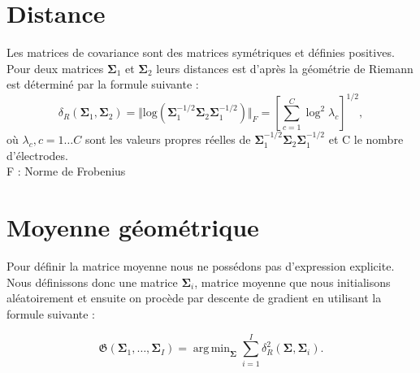 \documentclass{article}[12pt]
\newcommand{\argmin}{\mathop{\mathrm{arg\,min}}}
\begin{document}
\section{Distance}
Les matrices de covariance sont des matrices symétriques et définies positives.
Pour deux matrices $\mathbf{\Sigma}_1$ et $\mathbf{\Sigma}_2$ leurs distances est d’après la géométrie de Riemann est déterminé par la formule suivante :\\
\begin{equation}
\label{eq:Rgeodistance}
\delta_R(\mathbf{\Sigma}_1,\mathbf{\Sigma}_2) 
= 
\Vert \mathrm{log} \left( \mathbf{\Sigma}_1^{-1/2} \mathbf{\Sigma}_2 \mathbf{\Sigma}_1^{-1/2} \right) \Vert_F
=
\left[ \sum_{c=1}^{C} \log^2 \lambda_c \right]^{1/2},
\end{equation}
où $\lambda_c, c=1\ldots C$ sont les valeurs propres réelles de $\mathbf{\Sigma}_1^{-1/2} \mathbf{\Sigma}_2 \mathbf{\Sigma}_1^{-1/2}$ et C le nombre d’électrodes.
\\
F : Norme de Frobenius

\section{Moyenne géométrique}
Pour définir la matrice moyenne nous ne possédons pas d'expression explicite. Nous définissons donc une matrice $\mathbf{\Sigma}_i$, matrice moyenne que nous initialisons aléatoirement et ensuite on procède par descente de gradient en utilisant la formule suivante : 

\begin{equation}
\mathfrak{G} \left( \mathbf{\Sigma}_1,\ldots,\mathbf{\Sigma}_I \right) = \argmin_{\mathbf{\Sigma}} 
\sum_{i=1}^{I} 
\delta_R^2 \left( \mathbf{\Sigma},\mathbf{\Sigma}_i \right).
\label{eq:geo_mean}
\end{equation}
\end{document}
